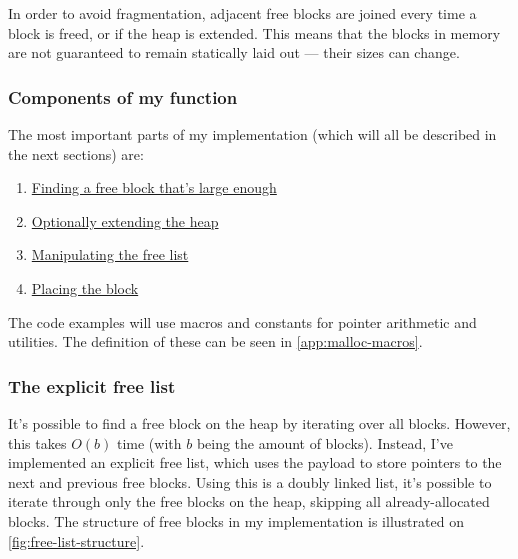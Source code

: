 In order to avoid fragmentation, adjacent free blocks are joined every time a block is freed, or if the heap is extended. This means that the blocks in memory are not guaranteed to remain statically laid out --- their sizes can change.

\subsubsection{Components of my  function}

The most important parts of my  implementation (which will all be described in the next sections) are:

\begin{enumerate}
  \item \hyperref[sec:find-fit]{Finding a free block that's large enough}
  \item \hyperref[sec:extend-heap]{Optionally extending the heap}
  \item \hyperref[sec:manipulate-free-list]{Manipulating the free list}
  \item \hyperref[sec:place-block]{Placing the block}
\end{enumerate}

The code examples will use macros and constants for pointer arithmetic and utilities. The definition of these can be seen in \autoref{app:malloc-macros}.

\subsubsection{The explicit free list}
\label{sec:free-list}

It's possible to find a free block on the heap by iterating over all blocks. However, this takes $O(b)$ time (with $b$ being the amount of blocks). Instead, I've implemented an explicit free list, which uses the payload to store pointers to the next and previous free blocks. Using this is a doubly linked list, it's possible to iterate through only the free blocks on the heap, skipping all already-allocated blocks. The structure of free blocks in my implementation is illustrated on \autoref{fig:free-list-structure}.

